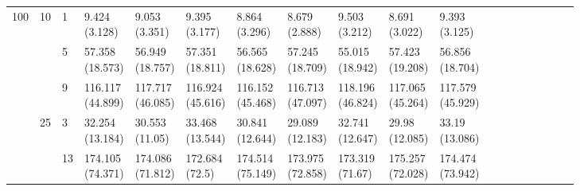 \documentclass[12pt,a4paper]{article}
\begin{document}
\begin{landscape}
\begin{longtable}{lllllllllllrrrrrrrr}
\multirow[t]{9}{*}{100} & \multirow[t]{3}{*}{10} & 1 & \makecell{9.424 \\ (3.128)} & \makecell{9.053 \\ (3.351)} & \makecell{9.395 \\ (3.177)} & \makecell{8.864 \\ (3.296)} & \makecell{8.679 \\ (2.888)} & \makecell{9.503 \\ (3.212)} & \makecell{8.691 \\ (3.022)} & \makecell{9.393 \\ (3.125)} \\
 &  & 5 & \makecell{57.358 \\ (18.573)} & \makecell{56.949 \\ (18.757)} & \makecell{57.351 \\ (18.811)} & \makecell{56.565 \\ (18.628)} & \makecell{57.245 \\ (18.709)} & \makecell{55.015 \\ (18.942)} & \makecell{57.423 \\ (19.208)} & \makecell{56.856 \\ (18.704)} \\
 &  & 9 & \makecell{116.117 \\ (44.899)} & \makecell{117.717 \\ (46.085)} & \makecell{116.924 \\ (45.616)} & \makecell{116.152 \\ (45.468)} & \makecell{116.713 \\ (47.097)} & \makecell{118.196 \\ (46.824)} & \makecell{117.065 \\ (45.264)} & \makecell{117.579 \\ (45.929)} \\
\cline{2-11}
 & \multirow[t]{3}{*}{25} & 3 & \makecell{32.254 \\ (13.184)} & \makecell{30.553 \\ (11.05)} & \makecell{33.468 \\ (13.544)} & \makecell{30.841 \\ (12.644)} & \makecell{29.089 \\ (12.183)} & \makecell{32.741 \\ (12.647)} & \makecell{29.98 \\ (12.085)} & \makecell{33.19 \\ (13.086)} \\
 &  & 13 & \makecell{174.105 \\ (74.371)} & \makecell{174.086 \\ (71.812)} & \makecell{172.684 \\ (72.5)} & \makecell{174.514 \\ (75.149)} & \makecell{173.975 \\ (72.858)} & \makecell{173.319 \\ (71.67)} & \makecell{175.257 \\ (72.028)} & \makecell{174.474 \\ (73.942)} \\

\end{longtable}
\end{landscape}
\end{document}
